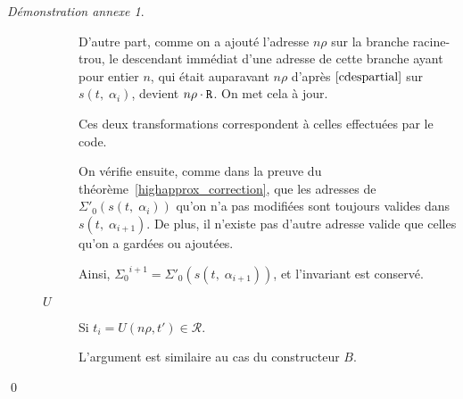 \documentclass[11pt,a4paper]{article}
\theoremstyle{plain}
\theoremstyle{definition}
\theoremstyle{remark}
\newtheorem{demonstrationappendix}{Démonstration annexe}
\newcommand*{\Right}{\textnormal{\texttt{R}}}
\newcommand*{\representations}{\ensuremath{\mathcal{R}}}
\newcommand*{\lowapprox}{\ensuremath{\Sigma_0}}
\newcommand*{\lowapproxspec}{\ensuremath{\Sigma'_0}}
\newcommand*{\treesimplify}{\ensuremath{s}}
\begin{document}
\begin{demonstrationappendix}
\begin{description}
\begin{description}
            D'autre part, comme on a ajouté l'adresse $n\rho$ sur la branche racine-trou, le descendant immédiat d'une adresse de cette branche ayant pour entier $n$, qui était auparavant $n\rho$ d'après $\ref{cdespartial}$ sur $\treesimplify( t, \; {\alpha}_{i} )$, devient $n\rho \cdot \Right$. On met cela à jour.

            Ces deux transformations correspondent à celles effectuées par le code.

            On vérifie ensuite, comme dans la preuve du théorème~\ref{highapprox_correction}, que les adresses de $\lowapproxspec \left( \treesimplify( t, \; {\alpha}_{i} ) \right)$ qu'on n'a pas modifiées sont toujours valides dans $\treesimplify( t, \; {\alpha}_{i+1} )$. De plus, il n'existe pas d'autre adresse valide que celles qu'on a gardées ou ajoutées.

            Ainsi, $\lowapprox^{i+1} = \lowapproxspec \left( \treesimplify( t, \; {\alpha}_{i+1} ) \right)$, et l'invariant est conservé.

            \item[$U$] Si $t_i = U(n\rho, t') \in \representations$.

            L'argument est similaire au cas du constructeur $B$.
            
        \end{description}
    \end{description}

    \qed{}
\end{demonstrationappendix}
\end{document}
